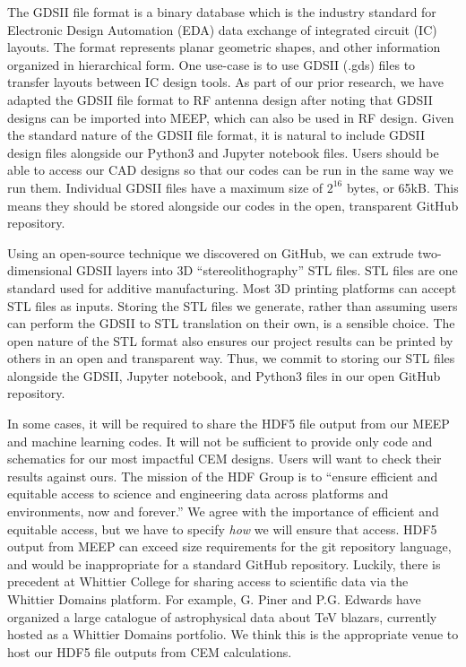 \documentclass[../../main.tex]{subfiles}
\begin{document}
The GDSII file format is a binary database which is the industry standard for Electronic Design Automation (EDA) data exchange of integrated circuit (IC) layouts.  The format represents planar geometric shapes, and other information organized in hierarchical form.  One use-case is to use GDSII (.gds) files to transfer layouts between IC design tools.  As part of our prior research, we have adapted the GDSII file format to RF antenna design after noting that GDSII designs can be imported into MEEP, which can also be used in RF design.  Given the standard nature of the GDSII file format, it is natural to include GDSII design files alongside our Python3 and Jupyter notebook files.  Users should be able to access our CAD designs so that our codes can be run in the same way we run them.  Individual GDSII files have a maximum size of $2^{16}$ bytes, or 65kB.  This means they should be stored alongside our codes in the open, transparent GitHub repository. \\ \vspace{2.5mm}

Using an open-source technique we discovered on GitHub, we can extrude two-dimensional GDSII layers into 3D ``stereolithography'' STL files.  STL files are one standard used for additive manufacturing.  Most 3D printing platforms can accept STL files as inputs.  Storing the STL files we generate, rather than assuming users can perform the GDSII to STL translation on their own, is a sensible choice.  The open nature of the STL format also ensures our project results can be printed by others in an open and transparent way.  Thus, we commit to storing our STL files alongside the GDSII, Jupyter notebook, and Python3 files in our open GitHub repository. \\ \vspace{2.5mm}

In some cases, it will be required to share the HDF5 file output from our MEEP and machine learning codes.  It will not be sufficient to provide only code and schematics for our most impactful CEM designs.  Users will want to check their results against ours.  The mission of the HDF Group is to ``ensure efficient and equitable access to science and engineering data across platforms and environments, now and forever.''  We agree with the importance of efficient and equitable access, but we have to specify \textit{how} we will ensure that access.  HDF5 output from MEEP can exceed size requirements for the git repository language, and would be inappropriate for a standard GitHub repository.  Luckily, there is precedent at Whittier College for sharing access to scientific data via the Whittier Domains platform.  For example, G. Piner and P.G. Edwards have organized a large catalogue of astrophysical data about TeV blazars, currently hosted as a Whittier Domains portfolio.  We think this is the appropriate venue to host our HDF5 file outputs from CEM calculations. \\ \vspace{2.5mm}
\end{document}
